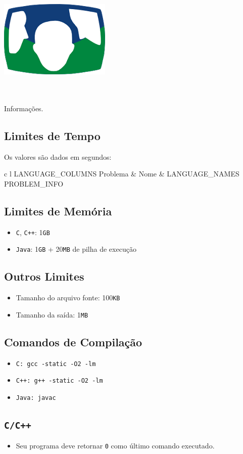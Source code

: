 \documentclass{UnBExam}%
\makeatletter
\newcommand{\infoHeader}{%
	\thispagestyle{empty}%

	\begin{center}%
		\includegraphics[width=.25\textwidth]{MaratonaUnB}%
	\end{center}%

	\begin{center}%
		{\Huge\bf\documento@UnBExam}%
		\\\vspace{1em}%
		{\small\emph{\data@UnBExam}}%
		\\\vspace{1em}%
		Informações.
	\end{center}%
}%
\makeatother
\begin{document}
%
	\infoHeader%
	\vspace{2em}%
	\subsection*{Limites de Tempo}%
	Os valores são dados em segundos:\\%
	\begin{center}%
		\begin{tabular}[t]{c l LANGUAGE_COLUMNS}%
			\hline%
			Problema & Nome & LANGUAGE_NAMES \\\hline%
			PROBLEM_INFO
		\end{tabular}%
	\end{center}%

	\subsection*{Limites de Memória}%
	\begin{itemize}%
		\setlength{\itemsep}{0pt}%
		\setlength{\parskip}{0pt}%
		\item \texttt{C}, \texttt{C++}: 1\texttt{GB}%
		\item \texttt{Java}: 1\texttt{GB} + 20\texttt{MB} de pilha de execução%
	\end{itemize}%

	\subsection*{Outros Limites}%
	\begin{itemize}%
		\setlength{\itemsep}{0pt}%
		\setlength{\parskip}{0pt}%
		\item Tamanho do arquivo fonte: 100\texttt{KB}%
		\item Tamanho da saída: 1\texttt{MB}%
	\end{itemize}%

	\subsection*{Comandos de Compilação}%
	\begin{itemize}%
		\setlength{\itemsep}{0pt}%
		\setlength{\parskip}{0pt}%
		\item \texttt{C: gcc -static -O2 -lm}%
		\item \texttt{C++: g++ -static -O2 -lm}%
		\item \texttt{Java: javac}%
	\end{itemize}%

	\subsection*{\texttt{C/C++}}%
	\begin{itemize}%
		\setlength{\itemsep}{0pt}%
		\setlength{\parskip}{0pt}%
		\item Seu programa deve retornar \texttt{0} como último comando executado.
	\end{itemize}%
\end{document}
